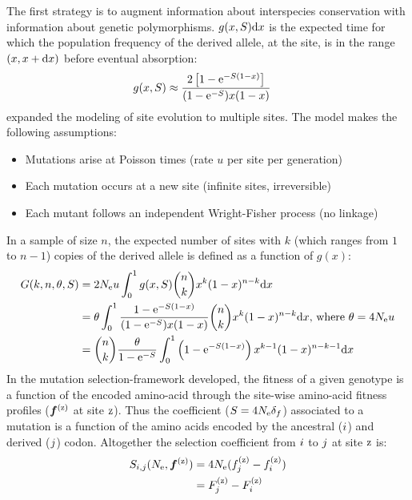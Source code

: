 The first strategy is to augment information about interspecies conservation with information about genetic polymorphisms.
$g(x, S) \mathrm{d} x $ is the expected time for which the population frequency of the derived allele, at the site, is in the range $(x, x+\mathrm{d} x)$ before eventual absorption:
\begin{align}
	g(x, S) & \approx \dfrac{2 \left[ 1 - \text{e}^{-S (1-x)}\right]}{(1 - \text{e}^{-S})x(1-x)}
\end{align}
\citet{Sawyer1992} expanded the modeling of site evolution to multiple sites.
The model makes the following assumptions:
\begin{itemize}
	\setlength\itemsep{-0.2em}
	\item Mutations arise at Poisson times (rate $u$ per site per generation)
	\item Each mutation occurs at a new site (infinite sites, irreversible)
	\item Each mutant follows an independent Wright-Fisher process (no linkage)
\end{itemize}
In a sample of size $n$, the expected number of sites with $k$ (which ranges from $1$ to $n-1$) copies of the derived allele is defined as a function of $g(x)$:
\begin{align}
	G(k, n, \theta, S) & = 2 N_{\text{e}} u \int_{0}^{1} g(x, S) \binom{n}{k} x^{k} (1-x)^{n-k} \mathrm{d} x \nonumber \\
	& = \theta \int_{0}^{1} \dfrac{1 - \text{e}^{-S (1-x)}}{(1 - \text{e}^{-S})x(1-x)} \binom{n}{k} x^{k} (1-x)^{n-k} \mathrm{d} x\text{, where } \theta=4N_{\text{e}} u \nonumber \\
	& = \binom{n}{k} \dfrac{\theta }{1 - \text{e}^{-S}} \int_{0}^{1} \left( 1 - \text{e}^{-S (1-x)} \right) x^{k-1} (1-x)^{n-k-1} \mathrm{d} x
\end{align}
In the mutation selection-framework developed, the fitness of a given genotype is a function of the encoded amino-acid through the site-wise amino-acid fitness profiles ($ \bm{f}^{(\text{z})} $ at site $\text{z}$). Thus the coefficient ($S=4N_{\text{e}} {\delta_{f}} $) associated to a mutation is a function of the amino acids encoded by the ancestral (${i}$) and derived (${j}$) codon. Altogether the selection coefficient from ${i}$ to ${j}$ at site $\text{z}$ is:
\begin{align}
	S_{{i}, {j}}(N_{\text{e}}, \bm{f}^{(\text{z})}) &= 4 N_{\text{e}} (f_{j}^{(\text{z})}-f_{i}^{(\text{z})}) \nonumber \\
	& = F_{j}^{(\text{z})}-F_{i}^{(\text{z})}
\end{align}
